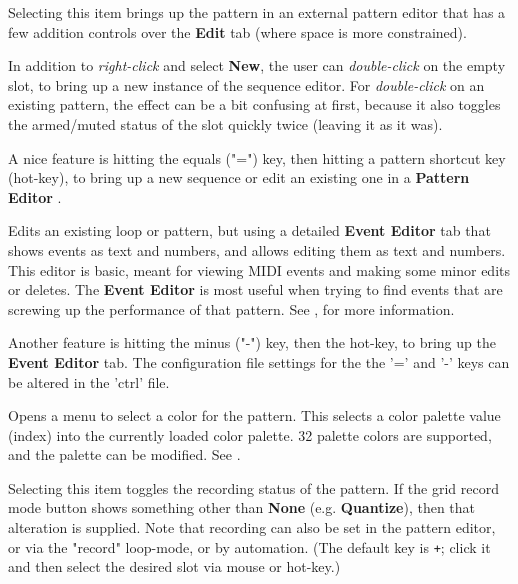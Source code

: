    Selecting this item brings up the pattern in an external pattern editor that
   has a few addition controls over the \textbf{Edit} tab (where space is more
   constrained).

   In addition to \textsl{right-click} and select \textbf{New}, the user can
   \textsl{double-click} on the empty slot,
   to bring up a new instance of the sequence
   editor.  For \textsl{double-click} on an existing pattern,
   the effect can be a bit confusing at first,
   because it also toggles the armed/muted status of the slot
   quickly twice (leaving it as it was).


   A nice feature is hitting the equals ("=") key, then hitting
   a pattern shortcut key (hot-key), to bring up a new sequence or edit an
   existing one in a \textbf{Pattern Editor} .

   Edits an existing loop or pattern, but using a detailed \textbf{Event Editor}
   tab that shows events as text and numbers, and allows editing them as text
   and numbers.
   This editor is basic, meant for viewing
   MIDI events and making some minor edits or deletes.
   The \textbf{Event Editor} is most useful when trying to find events
   that are screwing up the performance of that pattern.
   See , for more information.

   Another feature is hitting the minus
   ("-") key, then the hot-key, to bring up the \textbf{Event Editor} tab.
   The configuration file settings for the the '=' and
   '-' keys can be altered in the 'ctrl' file.

   Opens a menu to select a color for the pattern.  This selects a color
   palette value (index) into the currently loaded color palette.
   32 palette colors are supported, and the palette can be modified.
   See .

   Selecting this item toggles the recording status of the pattern.
   If the grid record mode button shows something other than
   \textbf{None} (e.g. \textbf{Quantize}), then that alteration is supplied.
   Note that recording can also be set in the pattern editor, or via
   the "record" loop-mode, or by automation.
   (The default key is \texttt{+}; click it and then select the
   desired slot via mouse or hot-key.)

